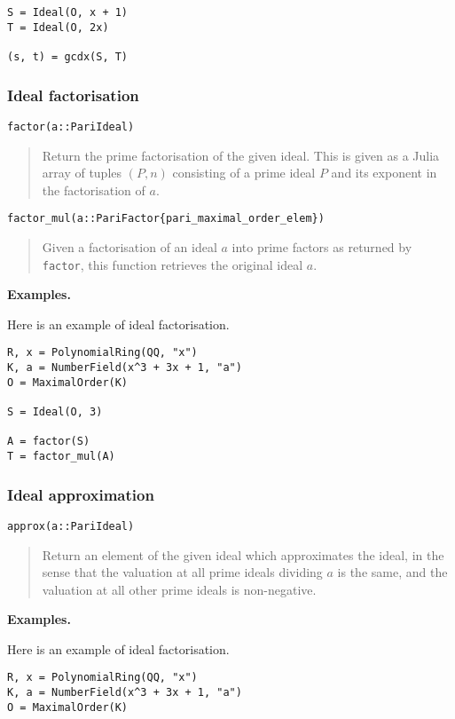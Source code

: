 \documentclass[a4paper,10pt]{article}
\newcommand{\code}{\lstinline}
\newcommand{\desc}[1]{\vspace{-3mm}\begin{quote}#1\end{quote}}
\begin{document}
{{\begin{lstlisting}
S = Ideal(O, x + 1)
T = Ideal(O, 2x)

(s, t) = gcdx(S, T)
\end{lstlisting}

\subsubsection{Ideal factorisation}

\begin{lstlisting}
factor(a::PariIdeal)
\end{lstlisting}

\desc{Return the prime factorisation of the given ideal. This is given as a Julia
array of tuples $(P, n)$ consisting of a prime ideal $P$ and its exponent in the
factorisation of $a$.}

\begin{lstlisting}
factor_mul(a::PariFactor{pari_maximal_order_elem})
\end{lstlisting}

\desc{Given a factorisation of an ideal $a$ into prime factors as returned by
\code{factor}, this function retrieves the original ideal $a$.}

\textbf{Examples.}

Here is an example of ideal factorisation.

\begin{lstlisting}
R, x = PolynomialRing(QQ, "x")
K, a = NumberField(x^3 + 3x + 1, "a")
O = MaximalOrder(K)

S = Ideal(O, 3)

A = factor(S)
T = factor_mul(A)
\end{lstlisting}

\subsubsection{Ideal approximation}

\begin{lstlisting}
approx(a::PariIdeal)
\end{lstlisting}

\desc{Return an element of the given ideal which approximates the ideal, in the
sense that the valuation at all prime ideals dividing $a$ is the same, and the
valuation at all other prime ideals is non-negative.}

\textbf{Examples.}

Here is an example of ideal factorisation.

\begin{lstlisting}
R, x = PolynomialRing(QQ, "x")
K, a = NumberField(x^3 + 3x + 1, "a")
O = MaximalOrder(K)


\end{lstlisting}}}
\end{document}
